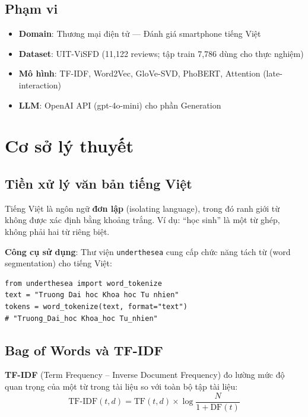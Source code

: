 \documentclass[12pt,a4paper]{article}
\begin{document}
\subsection{Phạm vi}

\begin{itemize}[leftmargin=2cm]
  \item \textbf{Domain}: Thương mại điện tử --- Đánh giá smartphone tiếng Việt
  \item \textbf{Dataset}: UIT-ViSFD (11,122 reviews; tập train 7,786 dùng cho thực nghiệm)
  \item \textbf{Mô hình}: TF-IDF, Word2Vec, GloVe-SVD, PhoBERT, Attention (late-interaction)
  \item \textbf{LLM}: OpenAI API (gpt-4o-mini) cho phần Generation
\end{itemize}

\section{Cơ sở lý thuyết}

\subsection{Tiền xử lý văn bản tiếng Việt}

Tiếng Việt là ngôn ngữ \textbf{đơn lập} (isolating language), trong đó ranh giới từ không được xác định bằng khoảng trắng. Ví dụ: ``học sinh'' là một từ ghép, không phải hai từ riêng biệt.

\textbf{Công cụ sử dụng}: Thư viện \texttt{underthesea} cung cấp chức năng tách từ (word segmentation) cho tiếng Việt:

\begin{lstlisting}[caption={Tách từ tiếng Việt}]
from underthesea import word_tokenize
text = "Truong Dai hoc Khoa hoc Tu nhien"
tokens = word_tokenize(text, format="text")
# "Truong_Dai_hoc Khoa_hoc Tu_nhien"
\end{lstlisting}

\subsection{Bag of Words và TF-IDF}

\textbf{TF-IDF} (Term Frequency -- Inverse Document Frequency) đo lường mức độ quan trọng của một từ trong tài liệu so với toàn bộ tập tài liệu:
\[
  \text{TF-IDF}(t, d) = \text{TF}(t, d) \times \log\frac{N}{1 + \text{DF}(t)}
\]
\end{document}
